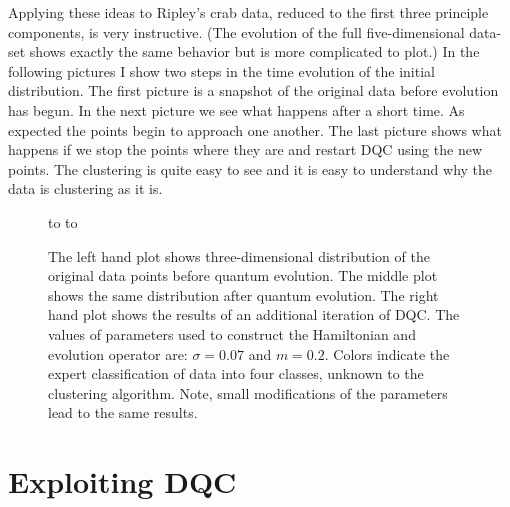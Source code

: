 \documentclass[fleqn,twoside]{article}
\begin{document}
Applying these ideas to Ripley's crab data, reduced to the
first three principle components, is very instructive.
(The evolution of the full five-dimensional data-set shows
exactly the same behavior but is more complicated to plot.)
In the following pictures I show two steps in the time evolution
of the initial distribution.  The first picture is a snapshot
of the original data before evolution has begun.  In the next
picture we see what happens after a short time. As expected
the points begin to approach one another.  The last picture
shows what happens if we stop the points where they are
and restart DQC using the new points.  The clustering is
quite easy to see and it is easy to understand why the
data is clustering as it is.
\begin{figure}[h!]
 \vbox{\hbox to \hbox to 
  }
  \caption{The left hand plot shows three-dimensional distribution of the
  original data points before quantum evolution.  The middle plot shows
  the same distribution after quantum evolution. The right hand plot shows the results
of an additional iteration of DQC. The values of parameters
 used to construct the Hamiltonian and evolution operator are:
  $\sigma = 0.07$ and $m = 0.2$. Colors indicate the
  expert classification of data into four classes, unknown to the clustering algorithm.
  Note, small modifications of the parameters lead to the same results.}
\label{new1}
\end{figure}

\section{Exploiting DQC}
\end{document}
